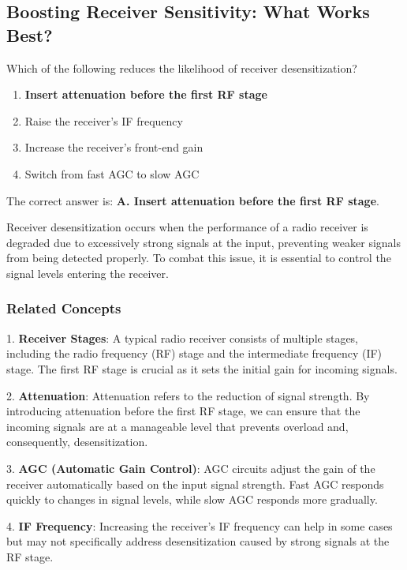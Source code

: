 \subsection{Boosting Receiver Sensitivity: What Works Best?}

\begin{tcolorbox}[colback=gray!10, colframe=black, title=E4D07`]
Which of the following reduces the likelihood of receiver desensitization? 
\begin{enumerate}[label=\Alph*.]
    \item \textbf{Insert attenuation before the first RF stage}
    \item Raise the receiver’s IF frequency
    \item Increase the receiver’s front-end gain
    \item Switch from fast AGC to slow AGC
\end{enumerate} \end{tcolorbox}

The correct answer is: \textbf{A. Insert attenuation before the first RF stage}.

Receiver desensitization occurs when the performance of a radio receiver is degraded due to excessively strong signals at the input, preventing weaker signals from being detected properly. To combat this issue, it is essential to control the signal levels entering the receiver.

\subsubsection*{ Related Concepts}

1. \textbf{Receiver Stages}: A typical radio receiver consists of multiple stages, including the radio frequency (RF) stage and the intermediate frequency (IF) stage. The first RF stage is crucial as it sets the initial gain for incoming signals.

2. \textbf{Attenuation}: Attenuation refers to the reduction of signal strength. By introducing attenuation before the first RF stage, we can ensure that the incoming signals are at a manageable level that prevents overload and, consequently, desensitization.

3. \textbf{AGC (Automatic Gain Control)}: AGC circuits adjust the gain of the receiver automatically based on the input signal strength. Fast AGC responds quickly to changes in signal levels, while slow AGC responds more gradually.

4. \textbf{IF Frequency}: Increasing the receiver's IF frequency can help in some cases but may not specifically address desensitization caused by strong signals at the RF stage.

